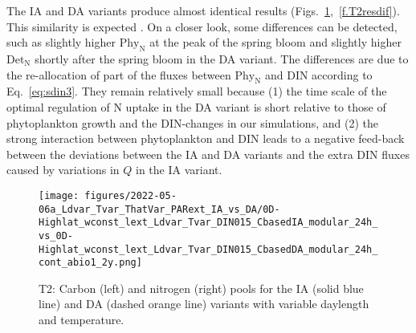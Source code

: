 \documentclass[gmd, manuscript]{copernicus}
\newcommand{\onur}[1]{\textcolor{blue}{\{Onur: #1\}}}
\newcommand{\markus}[1]{\textcolor{blue}{\{Markus: #1\}}}
\begin{document}

The IA and DA variants produce almost identical results (Figs.~\ref{f.T2res},~\ref{f.T2resdif}). This similarity is expected \citep{Ward2017}. On a closer look, some differences can be detected, such as slightly higher $\text{Phy}_{\text{N}}$ at the peak of the spring bloom and slightly higher $\text{Det}_{\text{N}}$ shortly after the spring bloom in the DA variant.  The differences are due to the re-allocation of part of the fluxes between $\text{Phy}_{\text{N}}$ and DIN according to Eq.~\eqref{eq:sdin3}.  They remain relatively small because (1) the time scale of the optimal regulation of N uptake in the DA variant is short relative to those of phytoplankton growth and the DIN-changes in our simulations, and (2) the strong interaction between phytoplankton and DIN leads to a negative feed-back between the deviations between the IA and DA variants and the extra DIN fluxes caused by variations in $Q$ in the IA variant.

\begin{figure}[htb!]
\texttt{[image: figures/2022-05-06a\_Ldvar\_Tvar\_ThatVar\_PARext\_IA\_vs\_DA/0D-Highlat\_wconst\_lext\_Ldvar\_Tvar\_DIN015\_CbasedIA\_modular\_24h\_vs\_0D-Highlat\_wconst\_lext\_Ldvar\_Tvar\_DIN015\_CbasedDA\_modular\_24h\_cont\_abio1\_2y.png]}
\caption{T2: Carbon (left) and nitrogen (right) pools for the IA (solid blue line) and DA (dashed orange line) variants with variable daylength and temperature.
\label{f.T2res}}
\end{figure}
\end{document}
